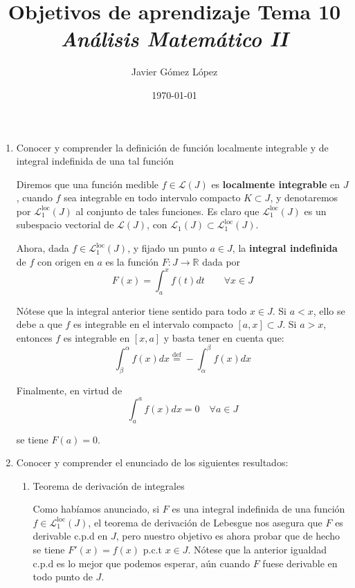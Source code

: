 \documentclass[a4paper, 12pt]{article}
\title{\textbf{Objetivos de aprendizaje Tema 10} \\ \textit{Análisis Matemático II}}
\author{Javier Gómez López}
\date{\today}
\begin{document}
\maketitle

\begin{enumerate}[label=\textbf{\arabic*}.]
	
	\item Conocer y comprender la definición de función localmente integrable y de integral indefinida de una tal función
	
	Diremos que una función medible \(f \in \mathcal{L} (J)\) es \textbf{localmente integrable} en \(J\), cuando \(f\) sea integrable en todo intervalo compacto \(K \subset J\), y denotaremos por \(\mathcal{L}_1^{\text{loc}} (J)\) al conjunto de tales funciones. Es claro que \(\mathcal{L}_1^{\text{loc}} (J)\) es un subespacio vectorial de \(\mathcal{L} (J)\), con \(\mathcal{L}_1 (J) \subset \mathcal{L}_1^{\text{loc}} (J)\). 
	
	Ahora, dada \(f \in \mathcal{L}_1^{\text{loc}} (J)\), y fijado un punto \(a \in J\), la \textbf{integral indefinida} de \(f\) con origen en \(a\) es la función \(F : J \to \mathbb{R}\) dada por
	\[
		F(x) = \int_a^x f(t) dt \qquad \forall x \in J
	\]
	
	Nótese que la integral anterior tiene sentido para todo \(x \in J\). Si \(a < x\), ello se debe a que \(f\) es integrable en el intervalo compacto \([a,x] \subset J\). Si \(a > x\), entonces \(f\) es integrable en \([x,a]\) y basta tener en cuenta que:
	\[
		\int_{\beta}^{\alpha} f(x) dx \overset{\text{def}}{=} - \int_{\alpha}^{\beta} f(x) dx
	\]
	
	Finalmente, en virtud de 
	\[
		\int_a^a f(x) dx = 0 \quad \forall a \in J
	\]
	
	se tiene \(F(a) = 0\).
	\bigskip
	
	\item Conocer y comprender el enunciado de los siguientes resultados:
	
	\begin{enumerate}[label=\textit{\alph*)}]
		\item Teorema de derivación de integrales
		
		Como habíamos anunciado, si \(F\) es una integral indefinida de una función \(f \in \mathcal{L}_1^{\text{loc}} (J)\), el teorema de derivación de Lebesgue nos asegura que \(F\) es derivable c.p.d en \(J\), pero nuestro objetivo es ahora probar que de hecho se tiene \(F'(x) = f(x)\) p.c.t \(x \in J\). Nótese que la anterior igualdad c.p.d es lo mejor que podemos esperar, aún cuando \(F\) fuese derivable en todo punto de \(J\). 
		

\end{enumerate}
\end{enumerate}
\end{document}
